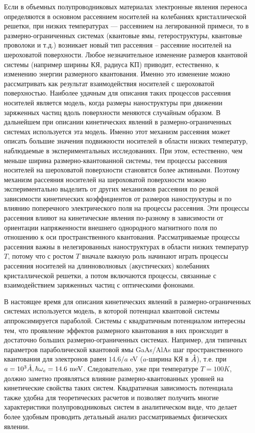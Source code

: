 Если в объемных полупроводниковых материалах электронные явления переноса определяются в основном рассеянием носителей на колебаниях кристаллической решетки, при низких температурах --- рассеянием на легированной примеси, то в размерно-ограниченных системах (квантовые ямы, гетероструктуры, квантовые проволоки и т.д.) возникает новый тип рассеяния – рассеяние носителей на шероховатой поверхности. Любое незначительное изменение размеров квантовой системы (например ширины КЯ, радиуса КП) приводит, естественно, к изменению энергии размерного квантования. Именно это изменение можно рассматривать как результат взаимодействия носителей с шероховатой поверхностью. Наиболее удачным для описания таких процессов рассеяния носителей является модель, когда размеры наноструктуры при движении заряженных частиц вдоль поверхности меняются случайным образом. В дальнейшем при описании кинетических явлений в размерно-ограниченных системах используется эта модель. Именно этот механизм рассеяния может описать большие значения подвижности носителей в области низких температур, наблюдаемые в экспериментальных исследованиях. При этом, естественно, чем меньше ширина размерно-квантованной системы, тем процессы рассеяния носителей на шероховатой поверхности становятся более активными. Поэтому механизм рассеяния носителей на шероховатой поверхности можно экспериментально выделить от других механизмов рассеяния по резкой зависимости кинетических коэффициентов от размеров наноструктуры и по влиянию поперечного электрического поля на процессы рассеяния. Эти процессы рассеяния влияют на кинетические явления по-разному в зависимости от ориентации напряженности внешнего однородного магнитного поля по отношению к оси пространственного квантования. Рассматриваемые процессы рассеяния важны в нелегированных наноструктурах в области низких температур $T$, потому что с ростом $T$ вначале важную роль начинают играть процессы рассеяния носителей на длинноволновых (акустических) колебаниях кристаллической решетки, а потом включаются процессы, связанные с взаимодействием заряженных частиц с оптическими фононами.

В настоящее время для описания кинетических явлений в размерно-ограниченных системах используется модель, в которой потенциал квантовой системы аппроксимируется параболой. Системы с квадратичным потенциалом интересны тем, что проявление эффектов размерного квантования в них происходит в достаточно больших размерно-ограниченных системах. Например, для типичных параметров параболической квантовой ямы GaAs/AlAs шаг пространственного квантования для электронов равен $14.6/a$ eV ($a$-ширина КЯ в $\AA$), т.е. при $a=10^3 \AA, \hbar\omega_e = 14.6 \text{ meV}$. Следовательно, уже при температуре $T=100 K$, должно заметно проявляться влияние размерно-квантованных уровней на кинетические свойства таких систем. Квадратичная зависимость потенциала также удобна для теоретических расчетов и позволяет получить многие характеристики полупроводниковых систем в аналитическом виде, что делает более удобным проводить детальный анализ рассматриваемых физических явлении.
\fi

